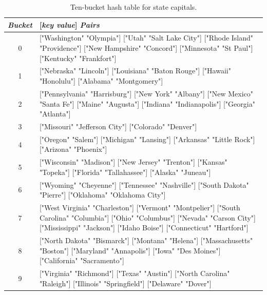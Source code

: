 \begin{table}
\begin{center}
\begin{tabular}{c|p{4in}}
\emph{Bucket} & \textsf{[}\emph{key value}\textsf{]} \emph{Pairs} \\
\hline
0 & \textsf{["Washington" "Olympia"]  ["Utah"  "Salt Lake City"]}  \hfill\break
\textsf{["Rhode Island"  "Providence"]  ["New Hampshire"  "Concord"]}  \hfill\break
\textsf{["Minnesota"  "St Paul"]  ["Kentucky"  "Frankfort"]} \\
\hline
1 & \textsf{["Nebraska"  "Lincoln"] ["Louisiana"  "Baton Rouge"]} \hfill\break
\textsf{["Hawaii"  "Honolulu"]  ["Alabama"  "Montgomery"]} \\
\hline
2 & \textsf{["Pennsylvania"  "Harrisburg"]  ["New York" "Albany"]} \hfill\break
\textsf{["New Mexico"  "Santa Fe"]  ["Maine"  "Augusta"]} \hfill\break
\textsf{["Indiana"  "Indianapolis"]  ["Georgia"  "Atlanta"]} \\
\hline
3 & \textsf{["Missouri"  "Jefferson City"]  ["Colorado"  "Denver"]} \\
\hline
4 & \textsf{["Oregon"  "Salem"]  ["Michigan"  "Lansing"]} \hfill\break
\textsf{["Arkansas"  "Little Rock"]  ["Arizona"  "Phoenix"]} \\
\hline
5 & \textsf{["Wisconsin" "Madison"]  ["New Jersey"  "Trenton"]} \hfill\break
\textsf{["Kansas"  "Topeka"]  ["Florida"  "Tallahassee"]} \hfill\break
\textsf{["Alaska"  "Juneau"]} \\
\hline
6 & \textsf{["Wyoming"  "Cheyenne"]  ["Tennessee"  "Nashville"]} \hfill\break
\textsf{["South Dakota"  "Pierre"]  ["Oklahoma"  "Oklahoma City"]} \\
\hline
7 & \textsf{["West Virginia"  "Charleston"]  ["Vermont"  "Montpelier"]} \hfill\break
\textsf{["South Carolina"  "Columbia"]  ["Ohio"  "Columbus"]} \hfill\break
\textsf{["Nevada"  "Carson City"]  ["Mississippi"  "Jackson"]} \hfill\break
\textsf{["Idaho  Boise"]  ["Connecticut"  "Hartford"]} \\
\hline
8 & \textsf{["North Dakota"  "Bismarck"]  ["Montana"  "Helena"]} \hfill\break
\textsf{["Massachusetts"  "Boston"]  ["Maryland"  "Annapolis"]} \hfill\break
\textsf{["Iowa" "Des Moines"]  ["California"  "Sacramento"]} \\
\hline
9 & \textsf{["Virginia"  "Richmond"]  ["Texas" "Austin"]} \hfill\break
\textsf{["North Carolina" "Raleigh"]  ["Illinois"  "Springfield"]} \hfill\break
\textsf{["Delaware"  "Dover"]} \\
\end{tabular}
\end{center}
\caption{Ten-bucket hash table for state capitals.}
\label{table:hash-table-state-capitals}
\end{table}

